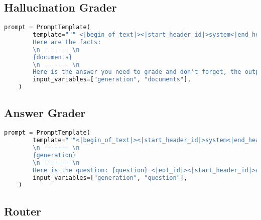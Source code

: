 \subsection{Hallucination Grader}

\begin{lstlisting}[language=Python, caption=\it{Prompt used for the hallucination grader.}]
    prompt = PromptTemplate(
        template=""" <|begin_of_text|><|start_header_id|>system<|end_header_id|> You are a grader assessing whether an answer is grounded in / supported by a set of facts. Give a binary 'yes' or 'no' score to indicate whether the answer is grounded in / supported by a set of facts. Provide the binary score as a JSON with a  single key 'score' and no preamble or explanation. Make sure to exactly output a json with one key 'score' <|eot_id|><|start_header_id|>user<|end_header_id|>
        Here are the facts:
        \n ------- \n
        {documents} 
        \n ------- \n
        Here is the answer you need to grade and don't forget, the output needs to be in json format with one and only one key called score (yes if the answer is grouned to the facts else no): {generation}  <|eot_id|><|start_header_id|>assistant<|end_header_id|>""",
        input_variables=["generation", "documents"],
    )
\end{lstlisting}

\subsection{Answer Grader}

\begin{lstlisting}[language=Python, caption=\it{Prompt used for the hallucination grader.}]
    prompt = PromptTemplate(
        template="""<|begin_of_text|><|start_header_id|>system<|end_header_id|> You are a grader assessing whether an answer is useful to resolve a question. Give a binary score 'yes' or 'no' to indicate whether the answer is useful to resolve a question. Provide the binary score as a JSON with a single key 'score' and no preamble or explanation. <|eot_id|><|start_header_id|>user<|end_header_id|> Here is the answer:
        \n ------- \n
        {generation} 
        \n ------- \n
        Here is the question: {question} <|eot_id|><|start_header_id|>assistant<|end_header_id|>""",
        input_variables=["generation", "question"],
    )
\end{lstlisting}

\subsection{Router}


